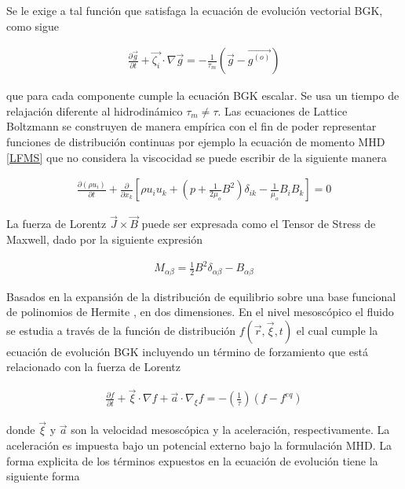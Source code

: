 \noindent Se le exige a tal función que satisfaga la ecuación de evolución vectorial BGK, como sigue

\begin{eqnarray}
    \label{LBMHD}
    \frac{\partial \vec{g}}{\partial t} + \vec{\zeta_{i}}\cdot\nabla\vec{g} = -\frac{1}{\tau_{m}}(\vec{g}-\vec{g^{(o)}})
\end{eqnarray}

\noindent que para cada componente cumple la ecuación BGK escalar. Se usa un tiempo de relajación diferente al hidrodinámico $\tau_{m} \neq \tau$. Las ecuaciones de Lattice Boltzmann se construyen de manera empírica con el fin de poder representar funciones de distribución continuas por ejemplo la ecuación de momento MHD \eqref{LFMS} que no considera la viscocidad se puede escribir de la siguiente manera

\begin{eqnarray}
    \frac{\partial(\rho u_{i})}{\partial t}+\frac{\partial}{\partial x_{k}}\left[\rho u_{i}u_{k}+\left(p+\frac{1}{2\mu_{o}}B^{2}\right)\delta_{ik}-\frac{1}{\mu_{o}}B_{i}B_{k}\right] = 0
\end{eqnarray}

\noindent La fuerza de Lorentz $\vec{J}\times\vec{B}$ puede ser expresada como el Tensor de Stress de Maxwell, dado por la siguiente expresión

\begin{eqnarray}
    M_{\alpha\beta} = \frac{1}{2}B^{2}\delta_{\alpha\beta}-B_{\alpha\beta}
\end{eqnarray}

\noindent Basados en la expansión de la distribución de equilibrio sobre una base funcional de polinomios de Hermite \cite{kruger}\cite{Dellar} , en dos dimensiones. En el nivel mesoscópico el fluido se estudia a través de la función de distribución $f(\vec{r},\vec{\xi},t)$ el cual cumple la ecuación de evolución BGK incluyendo un término de forzamiento que está relacionado con la fuerza de Lorentz

\begin{eqnarray}
    \frac{\partial f}{\partial t} + \vec{\xi}\cdot\nabla f + \vec{a}\cdot\nabla_{\xi}f=-\left(\frac{1}{\tau}\right)(f-f^{eq})
\end{eqnarray}

\noindent donde $\vec{\xi}$ y $\vec{a}$ son la velocidad mesoscópica y la aceleración, respectivamente. La aceleración es impuesta bajo un potencial externo bajo la formulación MHD. La forma explicita de los términos expuestos en la ecuación de evolución tiene la siguiente forma

